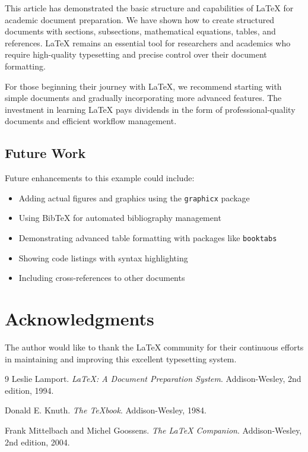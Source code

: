 \documentclass[12pt,a4paper]{article}
\begin{document}
This article has demonstrated the basic structure and capabilities of LaTeX for academic document preparation. We have shown how to create structured documents with sections, subsections, mathematical equations, tables, and references. LaTeX remains an essential tool for researchers and academics who require high-quality typesetting and precise control over their document formatting.

For those beginning their journey with LaTeX, we recommend starting with simple documents and gradually incorporating more advanced features. The investment in learning LaTeX pays dividends in the form of professional-quality documents and efficient workflow management.

\subsection{Future Work}

Future enhancements to this example could include:
\begin{itemize}
    \item Adding actual figures and graphics using the \texttt{graphicx} package
    \item Using BibTeX for automated bibliography management
    \item Demonstrating advanced table formatting with packages like \texttt{booktabs}
    \item Showing code listings with syntax highlighting
    \item Including cross-references to other documents
\end{itemize}

\section*{Acknowledgments}

The author would like to thank the LaTeX community for their continuous efforts in maintaining and improving this excellent typesetting system.

\begin{thebibliography}{9}
Leslie Lamport. 
\textit{LaTeX: A Document Preparation System}. 
Addison-Wesley, 2nd edition, 1994.

Donald E. Knuth. 
\textit{The TeXbook}. 
Addison-Wesley, 1984.

Frank Mittelbach and Michel Goossens. 
\textit{The LaTeX Companion}. 
Addison-Wesley, 2nd edition, 2004.
\end{thebibliography}
\end{document}
